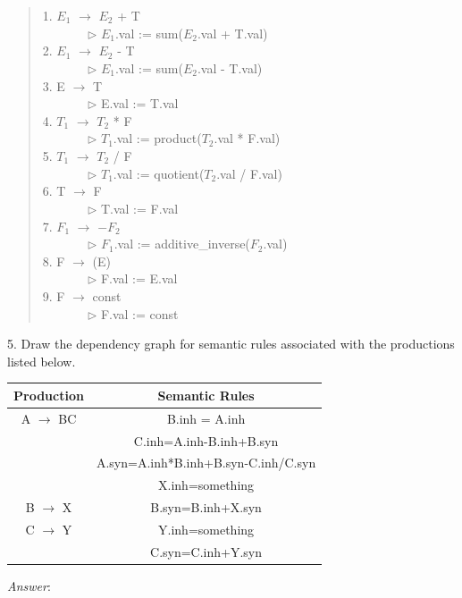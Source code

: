 \documentclass[a4paper,12pt]{article}
\begin{document}
\begin{quote}
1. $E_1$ $\longrightarrow$ $E_2$ + T \\
\verb+       +$\triangleright$ $E_1$.val := sum($E_2$.val + T.val)\\
2. $E_1$ $\longrightarrow$ $E_2$ - T \\
\verb+       +$\triangleright$ $E_1$.val := sum($E_2$.val - T.val)\\
3. E $\longrightarrow$  T \\
\verb+       +$\triangleright$ E.val := T.val\\
4. $T_1$ $\longrightarrow$ $T_2$ * F \\
\verb+       +$\triangleright$ $T_1$.val := product($T_2$.val * F.val)\\
5. $T_1$ $\longrightarrow$ $T_2$ / F \\
\verb+       +$\triangleright$ $T_1$.val := quotient($T_2$.val / F.val)\\
6. T $\longrightarrow$  F \\
\verb+       +$\triangleright$ T.val := F.val\\
7. $F_1$ $\longrightarrow$ $-F_2$\\
\verb+       +$\triangleright$ $F_1$.val := additive\_inverse($F_2$.val)\\
8. F $\longrightarrow$  (E) \\
\verb+       +$\triangleright$ F.val := E.val\\
9. F $\longrightarrow$ const\\
\verb+       +$\triangleright$ F.val := const\\
\end{quote}

5. Draw the dependency graph for semantic rules associated with the productions listed below.\\
\begin{center}
\begin{tabular}{|c|c|}
\hline
Production &  Semantic Rules\\
\hline
A $\longrightarrow$ BC & B.inh = A.inh\\
&C.inh=A.inh-B.inh+B.syn\\
&A.syn=A.inh*B.inh+B.syn-C.inh/C.syn\\
&X.inh=something\\
\hline
B $\longrightarrow$ X & B.syn=B.inh+X.syn\\
\hline
C $\longrightarrow$ Y & Y.inh=something\\
\hline
& C.syn=C.inh+Y.syn\\
\hline
\end{tabular}
\end{center}
\emph{Answer}:
\end{document}
